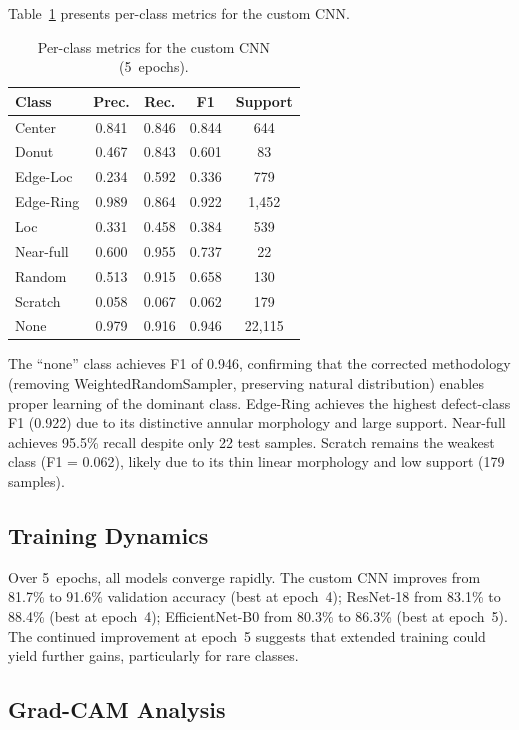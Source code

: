 \documentclass[conference]{IEEEtran}
\begin{document}
Table~\ref{tab:per_class} presents per-class metrics for the custom CNN.

\begin{table}[H]
\centering
\caption{Per-class metrics for the custom CNN (5~epochs).}
\label{tab:per_class}
\begin{tabular}{@{}lcccc@{}}
\toprule
\textbf{Class} & \textbf{Prec.} & \textbf{Rec.} & \textbf{F1}
               & \textbf{Support} \\
\midrule
Center      & 0.841 & 0.846 & 0.844 & 644 \\
Donut       & 0.467 & 0.843 & 0.601 & 83 \\
Edge-Loc    & 0.234 & 0.592 & 0.336 & 779 \\
Edge-Ring   & 0.989 & 0.864 & 0.922 & 1{,}452 \\
Loc         & 0.331 & 0.458 & 0.384 & 539 \\
Near-full   & 0.600 & 0.955 & 0.737 & 22 \\
Random      & 0.513 & 0.915 & 0.658 & 130 \\
Scratch     & 0.058 & 0.067 & 0.062 & 179 \\
None        & 0.979 & 0.916 & 0.946 & 22{,}115 \\
\bottomrule
\end{tabular}
\end{table}

The ``none'' class achieves F1 of 0.946, confirming that the corrected
methodology (removing WeightedRandomSampler, preserving natural distribution)
enables proper learning of the dominant class. Edge-Ring achieves the highest
defect-class F1 (0.922) due to its distinctive annular morphology and large
support. Near-full achieves 95.5\% recall despite only 22 test samples.
Scratch remains the weakest class (F1 = 0.062), likely due to its thin linear
morphology and low support (179 samples).

\subsection{Training Dynamics}

Over 5~epochs, all models converge rapidly. The custom CNN improves from
81.7\% to 91.6\% validation accuracy (best at epoch~4); ResNet-18 from
83.1\% to 88.4\% (best at epoch~4); EfficientNet-B0 from 80.3\% to 86.3\%
(best at epoch~5). The continued improvement at epoch~5 suggests that
extended training could yield further gains, particularly for rare classes.

\subsection{Grad-CAM Analysis}
\end{document}
